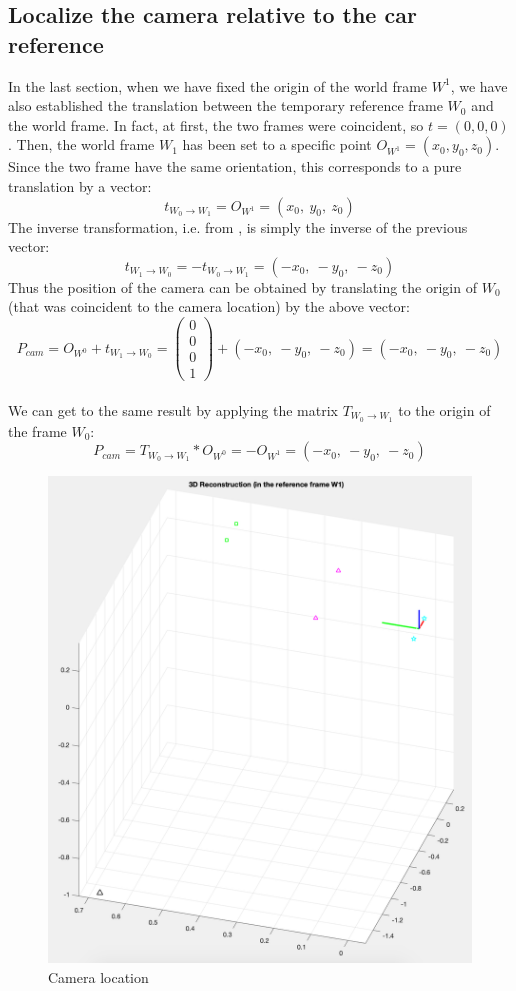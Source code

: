 \documentclass{article}
\begin{document}
\subsection{Localize the camera relative to the car reference}
In the last section, when we have fixed the origin of the world frame $W^1$, we have also established the translation between the temporary reference frame $W_0$ and the world frame. In fact, at first, the two frames were coincident, so $t=(0, 0, 0)$. Then, the world frame $W_1$ has been set to a specific point $O_{W^1}=(x_0, y_0, z_0)$. Since the two frame have the same orientation, this corresponds to a pure translation by a vector:
$$ t_{W_0 \rightarrow W_1} = O_{W^1} = (x_0, \: y_0, \: z_0) $$
The inverse transformation, i.e. from , is simply the inverse of the previous vector:
$$ t_{W_1 \rightarrow W_0} = -t_{W_0 \rightarrow W_1} = (-x_0, \: -y_0, \: -z_0) $$
Thus the position of the camera can be obtained by translating the origin of $W_0$ (that was coincident to the camera location) by the above vector:
$$ P_{cam} = O_{W^0} + t_{W_1 \rightarrow W_0} = \begin{pmatrix}
0 \\ 0 \\ 0 \\ 1
\end{pmatrix} + (-x_0, \: -y_0, \: -z_0) = (-x_0, \: -y_0, \: -z_0) $$
\\
We can get to the same result by applying the matrix $T_{W_0 \rightarrow W_1}$ to the origin of the frame $W_0$:
$$ P_{cam} = T_{W_0 \rightarrow W_1} * O_{W^0} = -O_{W^1} =  (-x_0, \: -y_0, \: -z_0) $$

\begin{figure}[hbt!]
\centering
\includegraphics[scale=0.25]{images/cameralocation.png}
\caption{Camera location}
\label{fig:cameralocation}
\end{figure}

\newpage


\end{document}
